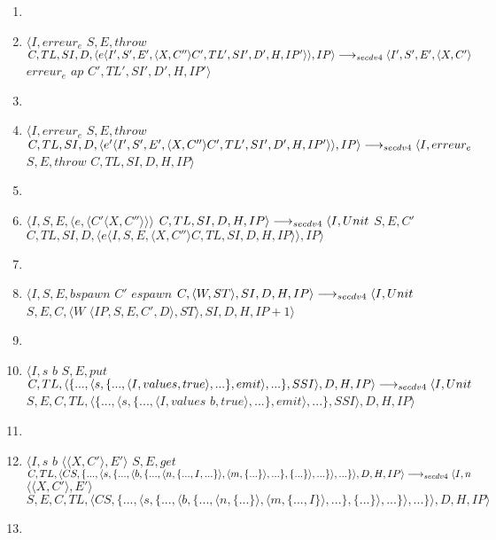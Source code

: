 \documentclass[10pt,a4paper]{article}
\begin{document}
\begin{enumerate}
				\item[]
				\item $\langle I,erreur_{e}$ $S,E,throw$ $C,TL,SI,D,\langle e\langle I',S',E',\langle X,C'' \rangle C',TL',SI',D',H,IP'\rangle\rangle,IP\rangle \\\longrightarrow_{secdv4} \langle I',S',E',\langle X,C' \rangle$ $erreur_{e}$ $ap$ $C',TL',SI',D',H,IP'\rangle$
				\item[]
				\item $\langle I,erreur_{e}$ $S,E,throw$ $C,TL,SI,D,\langle e'\langle I',S',E',\langle X,C'' \rangle C',TL',SI',D',H,IP'\rangle\rangle,IP\rangle \\\longrightarrow_{secdv4}\langle I,erreur_{e}$ $S,E,throw$ $ C,TL,SI,D,H,IP\rangle$
				\item[]
				\item $\langle I,S,E,\langle e,\langle C'\langle X,C''\rangle\rangle\rangle$ $C,TL,SI,D,H,IP\rangle 
				\\\longrightarrow_{secdv4} \langle I,Unit$ $S,E,C'$ $C,TL,SI,D,\langle e\langle I,S,E,\langle X,C'' \rangle C,TL,SI,D,H,IP\rangle\rangle,IP\rangle$
				\item[]
				\item $\langle I,S,E,bspawn$ $C'$ $espawn$ $C,\langle W,ST\rangle,SI,D,H,IP\rangle 
				\\\longrightarrow_{secdv4} \langle I,Unit$ $S,E,C,\langle W$ $\langle IP,S,E,C',D\rangle,ST\rangle,SI,D,H,IP+1\rangle$
				\item[]
				\item $\langle I,s$ $b$ $S,E,put$ $C,TL,\langle \{...,\langle s,\{...,\langle I,values,true\rangle,...\},emit\rangle,...\},SSI\rangle,D,H,IP\rangle \\\longrightarrow_{secdv4} \langle I,Unit$ $S,E,C,TL,\langle \{...,\langle s,\{...,\langle I,values $ $b,true\rangle,...\},emit\rangle,...\},SSI\rangle,D,H,IP\rangle$
				\item[]
				\item $\langle I,s$ $b$ $\langle\langle X,C'\rangle,E'\rangle$ $S,E,get$ $C,TL,\langle CS,\{...,\langle s,\{...,\langle b,\{...,\langle n,\{...,I,...\}\rangle,\langle m,\{...\}\rangle,...\},\{...\}\rangle,...\}\rangle,...\}\rangle,D,H,IP\rangle \\\longrightarrow_{secdv4} \langle I,n$ $\langle\langle X,C'\rangle,E'\rangle$ $S,E,C,TL,\langle CS,\{...,\langle s,\{...,\langle b,\{...,\langle n,\{...\}\rangle,\langle m,\{...,I\}\rangle,...\},\{...\}\rangle,...\}\rangle,...\}\rangle,D,H,IP\rangle$
				\item[]

\end{enumerate}
\end{document}

